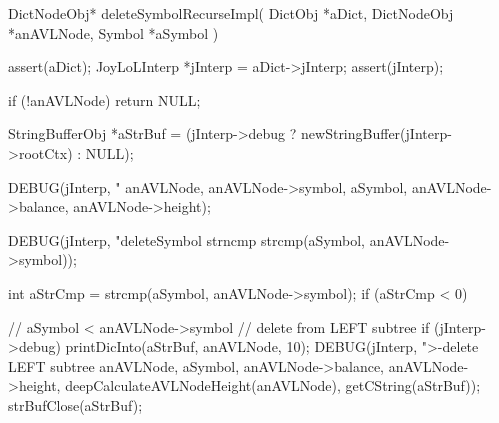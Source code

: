 \startCCode
DictNodeObj* deleteSymbolRecurseImpl(
  DictObj     *aDict,
  DictNodeObj *anAVLNode,
  Symbol      *aSymbol
) {
  assert(aDict);
  JoyLoLInterp *jInterp = aDict->jInterp;
  assert(jInterp);
  
  if (!anAVLNode) return NULL;

  StringBufferObj *aStrBuf = 
    (jInterp->debug ? newStringBuffer(jInterp->rootCtx) : NULL);

  DEBUG(jInterp, "\ndeleteSymbol %
        anAVLNode, anAVLNode->symbol, aSymbol,
        anAVLNode->balance, anAVLNode->height);

  DEBUG(jInterp, "deleteSymbol strncmp %
        strcmp(aSymbol, anAVLNode->symbol));

  int aStrCmp = strcmp(aSymbol, anAVLNode->symbol);
  if (aStrCmp < 0) {
    // aSymbol < anAVLNode->symbol // delete from LEFT subtree
    if (jInterp->debug) {
      printDicInto(aStrBuf, anAVLNode, 10);
      DEBUG(jInterp, ">-delete LEFT subtree %
            anAVLNode, aSymbol, anAVLNode->balance,
            anAVLNode->height, deepCalculateAVLNodeHeight(anAVLNode),
            getCString(aStrBuf));
      strBufClose(aStrBuf);
    }

}}
